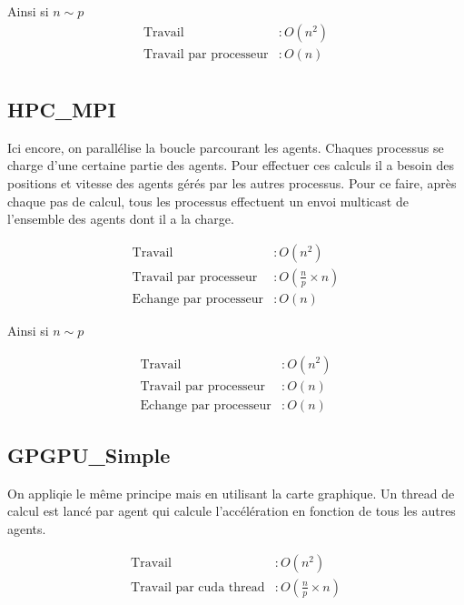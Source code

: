 \documentclass[liens,entete-ensimag,margeCorrection]{ensirapport}
\begin{document}
Ainsi si $n\sim p$
\begin{align*}
    \text{Travail} &: O\left( n^2 \right)  \\
    \text{Travail par processeur} &: O\left( n \right) \\
\end{align*}

\subsection{HPC\_MPI}
Ici encore, on parallélise la boucle parcourant les agents.
Chaques processus se charge d'une certaine partie des agents.
Pour effectuer ces calculs il a besoin des positions et vitesse des agents gérés par les autres processus.
Pour ce faire, après chaque pas de calcul, tous les processus effectuent un envoi multicast de l'ensemble des agents dont il a la charge.

\begin{align*}
    \text{Travail} &: O\left( n^2 \right) \\
    \text{Travail par processeur} &: O\left( \frac n p \times n \right)  \\
    \text{Echange par processeur} &: O\left(n\right)
\end{align*}

Ainsi si $n \sim p$

\begin{align*}
    \text{Travail} &: O\left( n^2 \right) \\
    \text{Travail par processeur} &: O\left( n \right)  \\
    \text{Echange par processeur} &: O\left(n\right)
\end{align*}

\subsection{GPGPU\_Simple}

On appliqie le même principe mais en utilisant la carte graphique. Un thread de calcul est lancé par agent qui calcule l'accélération en fonction de tous les autres agents.

\begin{align*}
    \text{Travail} &: O\left( n^2 \right) \\
    \text{Travail par cuda thread} &: O\left( \frac n p \times n \right)  \\
\end{align*}
\end{document}
